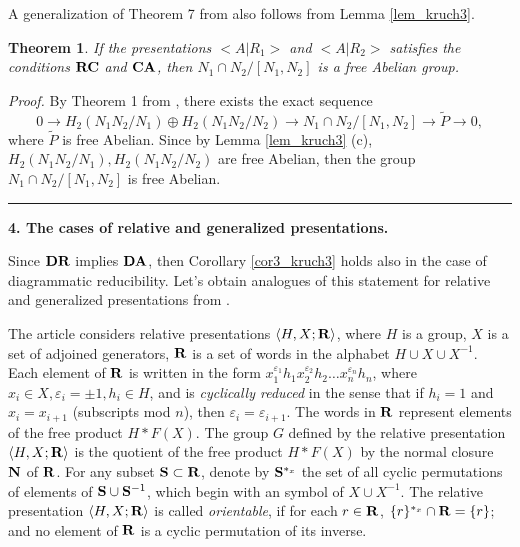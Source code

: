 \documentclass[12pt,reqno]{amsart}
\def\edvo{\rule {6pt}{6pt}}
\newtheorem{thm}{Theorem}
\begin{document}
A generalization of Theorem 7 from \cite{kuzmin2} also follows from Lemma \ref{lem_kruch3}.


  \begin{thm}\label{kruch4}
If the presentations $<A|R_1>$ and $<A|R_2>$ satisfies the conditions $\bf RC$ and $\bf CA$, then $N_1\cap N_2/[N_1,N_2]$ is a free Abelian group.
 \end{thm}
{\it Proof.}
 By Theorem 1 from \cite{kuzmin2}, there exists the exact sequence
 $$0\rightarrow H_2(N_1N_2/N_1)\oplus H_2(N_1N_2/N_2)\rightarrow N_1\cap N_2/[N_1,N_2]\rightarrow \widetilde{P}\rightarrow 0,$$
 where $\widetilde{P}$ is free Abelian. Since by Lemma \ref{lem_kruch3} (c), $H_2(N_1N_2/N_1), H_2(N_1N_2/N_2)$ are free Abelian, then the group $N_1\cap N_2/[N_1,N_2]$ is free Abelian.
\edvo

\vspace{3mm}





 {\bf 4. The cases of relative and generalized presentations. }

 Since $\bf DR$ implies $\bf DA$, then Corollary \ref{cor3_kruch3} holds also in the case of diagrammatic reducibility. Let's obtain analogues of this statement for relative and generalized presentations from \cite{BogleyPride}.

The article \cite{BogleyPride} considers relative presentations
$\langle H,X;{\bf R} \rangle$, where $H$ is a group, $X$ is a set of adjoined generators, ${\bf R}$ is a set of words in the alphabet $H\cup X\cup X^{-1}$. Each element of ${\bf R}$ is written in the form $x_1^{\varepsilon_1}h_1x_2^{\varepsilon_2}h_2\ldots x_n^{\varepsilon_n}h_n$, where
$x_i\in X, \varepsilon_i=\pm 1, h_i\in H$, and is {\it cyclically reduced} in the sense that if $h_i=1$ and $x_i=x_{i+1}$ (subscripts mod $n$), then $\varepsilon_i=\varepsilon_{i+1}$. The words in $\bf R$ represent elements of the free product $H\ast  F(X)$.
 The group $G$ defined by the relative presentation $\langle H,X;{\bf R} \rangle$ is the quotient of the free product
$H\ast  F(X)$ by the normal closure $\bf N$ of $\bf R$.
For any subset $\bf S\subset R$, denote by ${\bf S}^{*_x}$ the set of all cyclic permutations of elements of ${\bf S}\cup {\bf S}^{-1}$, which begin with an symbol of $X\cup X^{-1}$.
  The relative presentation $\langle H,X;{\bf R}\rangle$ is called {\it orientable}, if for each $r\in {\bf R}$, $\{r\}^{*_x}\cap {\bf R}=\{r\}$; and no element of ${\bf R}$ is a cyclic permutation of its inverse.
\end{document}

